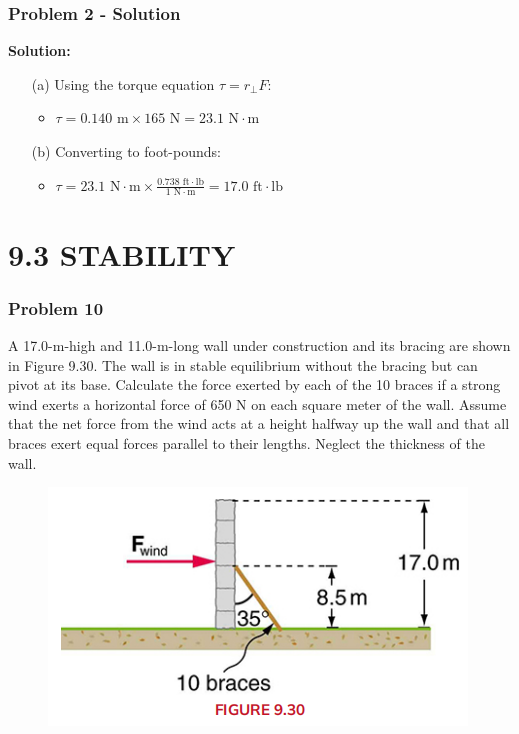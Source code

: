 \documentclass{beamer}
\begin{document}
\begin{frame}
\frametitle{Problem 2 - Solution}
\textbf{Solution:}
\begin{itemize}
    \item[(a)] Using the torque equation $\tau = r_\perp F$:
    \begin{itemize}
        \item $\tau = 0.140 \text{ m} \times 165 \text{ N} = 23.1 \text{ N} \cdot \text{m}$
    \end{itemize}
    \item[(b)] Converting to foot-pounds:
    \begin{itemize}
        \item $\tau = 23.1 \text{ N}\cdot\text{m} \times \frac{0.738 \text{ ft}\cdot\text{lb}}{1 \text{ N}\cdot\text{m}} = 17.0 \text{ ft}\cdot\text{lb}$
    \end{itemize}
\end{itemize}
\end{frame}

\section{9.3 STABILITY}

\begin{frame}
\frametitle{Problem 10}
A 17.0-m-high and 11.0-m-long wall under construction and its bracing are shown in Figure 9.30. The wall is in stable equilibrium without the bracing but can pivot at its base. Calculate the force exerted by each of the 10 braces if a strong wind exerts a horizontal force of 650 N on each square meter of the wall. Assume that the net force from the wind acts at a height halfway up the wall and that all braces exert equal forces parallel to their lengths. Neglect the thickness of the wall.
\begin{figure}[H]
    \centering
    \includegraphics[width=0.7\linewidth]{Screenshot 2024-11-04 122251.png}
\end{figure}

\end{frame}
\end{document}
